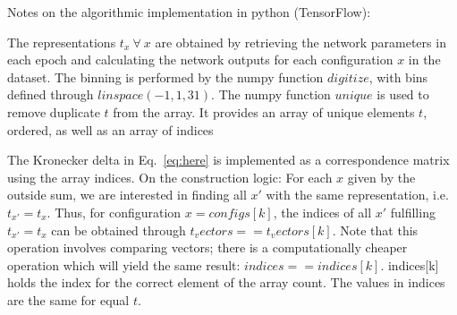 \documentclass[12pt]{report}
\begin{document}
Notes on the algorithmic implementation in python (TensorFlow):

The representations $t_x~\forall~x$ are obtained by retrieving the network parameters in each epoch and calculating the network outputs for each configuration $x$ in the dataset. The binning is performed by the numpy function $digitize$, with bins defined through $linspace(-1,1,31)$. The numpy function $unique$ is used to remove duplicate $t$ from the array. It provides an array of unique elements $t$, ordered, as well as an array of indices 


The Kronecker delta in Eq.~\eqref{eq:here} is implemented as a correspondence matrix using the array indices. On the construction logic: For each $x$ given by the outside sum, we are interested in finding all $x'$ with the same representation, i.e. $t_{x'} = t_x$. Thus, for configuration $x=configs[k]$, the indices of all $x'$ fulfilling $t_{x'} = t_x$ can be obtained through $t_vectors==t_vectors[k]$. Note that this operation involves comparing vectors; there is a computationally cheaper operation which will yield the same result: $indices==indices[k]$.
indices[k] holds the index for the correct element of the array count. The values in indices are the same for equal $t$.
\end{document}
